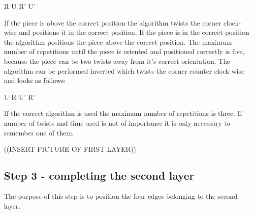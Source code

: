 R U R' U'

If the piece is above the correct position the algorithm twists the corner clock-wise and positions it in the correct position. If the piece is in the correct position the algorithm positions the piece above the correct position. The maximum number of repetitions until the piece is oriented and positioned correctly is five, because the piece can be two twists away from it's correct orientation. 
The algorithm can be performed inverted which twists the corner counter clock-wise and looks as follows:

U R U' R'

If the correct algorithm is used the maximum number of repetitions is three. If number of twists and time used is not of importance it is only necessary to remember one of them.

((INSERT PICTURE OF FIRST LAYER))

\subsection{Step 3 - completing the second layer}
The purpose of this step is to position the four edges belonging to the second layer.